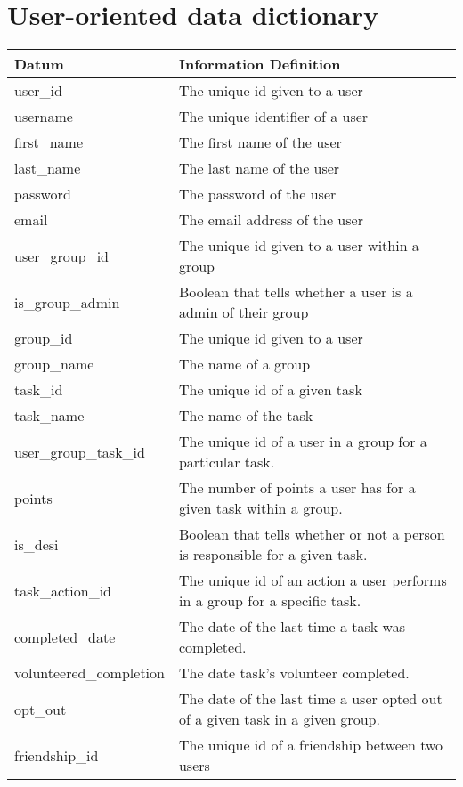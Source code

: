 \documentclass[11pt, a4paper]{report}
\begin{document}
\section{User-oriented data dictionary}
\begin{table}[H]
\centering
\begin{tabular}{| l | l |}
Datum & Information Definition \\\hline

user\_id & The unique id given to a user\\
username & The unique identifier of a user\\
first\_name & The first name of the user\\
last\_name & The last name of the user\\
password & The password of the user\\
email & The email address of the user\\

user\_group\_id & The unique id given to a user within a group\\
is\_group\_admin & Boolean that tells whether a user is a admin of their group\\

group\_id & The unique id given to a user\\
group\_name & The name of a group\\

task\_id & The unique id of a given task\\
task\_name & The name of the task\\

user\_group\_task\_id & The unique id of a user in a group for a particular task.\\
points & The number of points a user has for a given task within a group.\\
is\_desi & Boolean that tells whether or not a person is responsible for a given task.\\

task\_action\_id & The unique id of an action a user performs in a group for a specific task. \\
completed\_date & The date of the last time a task was completed.\\
volunteered\_completion & The date task's volunteer completed.\\
opt\_out & The date of the last time a user opted out of a given task in a given group.\\

friendship\_id & The unique id of a friendship between two users\\


\end{tabular}
\end{table}
\end{document}

